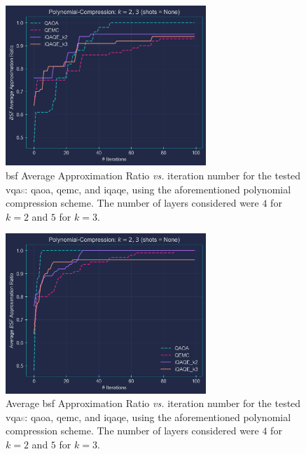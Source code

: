 \begin{figure}[H]
  \centering
  \includegraphics[width=0.675\textwidth]{Figures/Chapter_5/Polynomial_Compression_Base_k2_k3_2.png}
  \caption{\acrshort{bsf} Average Approximation Ratio \textit{vs.} iteration number for the tested \acrshort{vqa}\textcolor{gray}{s}: \acrshort{qaoa}, \acrshort{qemc}, and \acrshort{iqaqe}, using the aforementioned polynomial compression scheme. The number of layers considered were $4$ for $k = 2$ and $5$ for $k = 3$.}
  \label{fig:Comparison_k2+k3_1}
\end{figure}

\begin{figure}[H]
  \centering
  \includegraphics[width=0.675\textwidth]{Figures/Chapter_5/Polynomial_Compression_Base_k2_k3_1.png}
  \caption{Average \acrshort{bsf} Approximation Ratio \textit{vs.} iteration number for the tested \acrshort{vqa}\textcolor{gray}{s}: \acrshort{qaoa}, \acrshort{qemc}, and \acrshort{iqaqe}, using the aforementioned polynomial compression scheme. The number of layers considered were $4$ for $k = 2$ and $5$ for $k = 3$.}
  \label{fig:Comparison_k2+k3_2}
\end{figure}



